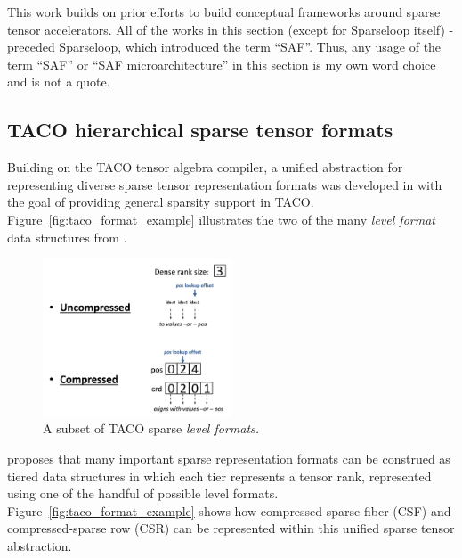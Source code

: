 This work builds on prior efforts to build conceptual frameworks around sparse tensor accelerators. All of the works in this section (except for Sparseloop\cite{sparseloop} itself) -  preceded Sparseloop, which introduced the term ``SAF''. Thus, any usage of the term ``SAF'' or ``SAF microarchitecture'' in this section is my own word choice and is not a quote.

\subsection{TACO\cite{taco}\cite{taco_format} hierarchical sparse tensor formats}
\label{sec:taco_format}

Building on the TACO tensor algebra compiler\cite{taco}, a unified abstraction for representing diverse sparse tensor representation formats was developed in \cite{taco_format} with the goal of providing general sparsity support in TACO\cite{taco}. Figure~\ref{fig:taco_format_example} illustrates the two of the many \textit{level format} data structures from \cite{taco_format}.

\begin{figure}[H]
\centering
\includegraphics[width=0.5\textwidth]{figures/taco_levels.png}
\caption{A subset\cite{taco_format} of TACO\cite{taco} sparse \textit{level formats.}}
\label{fig:taco_levels}
\end{figure}

\cite{taco_format} proposes that many important sparse representation formats can be construed as tiered data structures in which each tier represents a tensor rank, represented using one of the handful of possible level formats. Figure~\ref{fig:taco_format_example} shows how compressed-sparse fiber (CSF)\cite{csf} and compressed-sparse row (CSR) can be represented within this unified sparse tensor abstraction.

